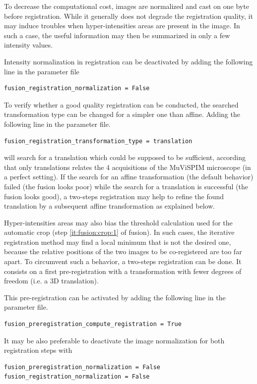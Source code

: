 To decrease the computational cost, images are normalized and cast on one byte before registration. While it generally does not degrade the registration quality, it may induce troubles when hyper-intensities areas are present in the image. In such a case, the useful information may then be summarized in only a few intensity values.

Intensity normalization in registration can be deactivated by adding the following line in the parameter file
\begin{verbatim}
fusion_registration_normalization = False
\end{verbatim}

To verify whether a good quality registration can be conducted, the searched transformation type can be changed for a simpler one than affine. 
Adding the following line in the parameter file.
\begin{verbatim}
fusion_registration_transformation_type = translation
\end{verbatim}
will search for a translation which could be supposed to be sufficient, according that only translations relates the 4 acquisitions of the MuViSPIM microscope (in a perfect setting). If the search for an affine transformation (the default behavior) failed (the fusion looks poor) while the search for a translation is successful (the fusion looks good), a two-steps registration may help to refine the found translation by a subsequent affine transformation as explained below.

Hyper-intensities areas may also bias the threshold calculation used for the automatic crop (step \ref{it:fusion:crop:1} of fusion). In such cases, the iterative registration method may find a local minimum that is not the desired one, because the relative positions of the two images to be co-registered are too far apart. To circumvent such a behavior, a two-steps registration can be done. It consists on a first pre-registration with a transformation with fewer degrees of freedom (i.e. a 3D translation). 

This pre-registration can be activated by adding the following line in the parameter file.
\begin{verbatim}
fusion_preregistration_compute_registration = True
\end{verbatim}
It may be also preferable to deactivate the image normalization for both registration steps with
\begin{verbatim}
fusion_preregistration_normalization = False
fusion_registration_normalization = False
\end{verbatim}

